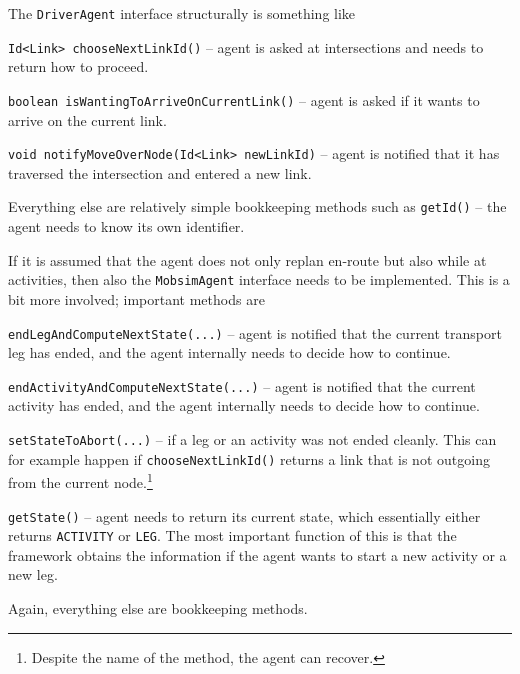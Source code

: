 The \verb$DriverAgent$ interface structurally is something like
\begin{compactitem}

\item \verb$Id<Link> chooseNextLinkId()$ -- agent is asked at intersections and needs to return how to proceed.




\item \verb$boolean isWantingToArriveOnCurrentLink()$ -- agent is asked if it wants to arrive on the current link.

\item \verb$void notifyMoveOverNode(Id<Link> newLinkId)$ -- agent is notified that it has traversed the intersection and entered a new link.

\end{compactitem}
Everything else are relatively simple bookkeeping methods such as \verb$getId()$ -- the agent needs to know its own identifier.

If it is assumed that the agent does not only replan en-route but also while at activities, then also the \verb$MobsimAgent$ interface needs to be implemented.  This is a bit more involved; important methods are
\begin{compactitem}

\item \verb$endLegAndComputeNextState(...)$ -- agent is notified that the current transport leg has ended, and the agent internally needs to decide how to continue.

\item \verb$endActivityAndComputeNextState(...)$ -- agent is notified that the current activity has ended, and the agent internally needs to decide how to continue.

\item \verb$setStateToAbort(...)$ -- if a leg or an activity was not ended cleanly.  This can for example happen if \verb$chooseNextLinkId()$ returns a link that is not outgoing from the current node.\footnote{%
%
Despite the name of the method, the agent can recover.  %
}

\item \verb$getState()$ -- agent needs to return its current state, which essentially either returns \verb$ACTIVITY$ or \verb$LEG$.  The most important function of this is that the framework obtains the information if the agent wants to start a new activity or a new leg.

\end{compactitem}
Again, everything else are bookkeeping methods.

